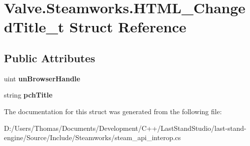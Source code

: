 \hypertarget{structValve_1_1Steamworks_1_1HTML__ChangedTitle__t}{}\section{Valve.\+Steamworks.\+H\+T\+M\+L\+\_\+\+Changed\+Title\+\_\+t Struct Reference}
\label{structValve_1_1Steamworks_1_1HTML__ChangedTitle__t}
\subsection*{Public Attributes}
\begin{DoxyCompactItemize}
\item 
\hypertarget{structValve_1_1Steamworks_1_1HTML__ChangedTitle__t_a736dadb9161137e87c26544111bcb65a}{}uint {\bfseries un\+Browser\+Handle}\label{structValve_1_1Steamworks_1_1HTML__ChangedTitle__t_a736dadb9161137e87c26544111bcb65a}

\item 
\hypertarget{structValve_1_1Steamworks_1_1HTML__ChangedTitle__t_a6a676752ea39288fb666c70dc6fe31d9}{}string {\bfseries pch\+Title}\label{structValve_1_1Steamworks_1_1HTML__ChangedTitle__t_a6a676752ea39288fb666c70dc6fe31d9}

\end{DoxyCompactItemize}


The documentation for this struct was generated from the following file\+:\begin{DoxyCompactItemize}
\item 
D\+:/\+Users/\+Thomas/\+Documents/\+Development/\+C++/\+Last\+Stand\+Studio/last-\/stand-\/engine/\+Source/\+Include/\+Steamworks/steam\+\_\+api\+\_\+interop.\+cs\end{DoxyCompactItemize}
